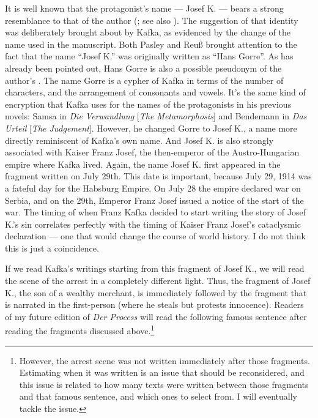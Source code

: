 \documentclass{article}
\begin{document}
It is well known that the protagonist's name –– Josef K. –– bears a
strong resemblance to that of the author (\cite[183]{sokel_franz_1976}; see also \cite[195]{binder_kafka-kommentar_1976}). The suggestion of that identity was
deliberately brought about by Kafka, as evidenced by the change of the
name used in the manuscript. Both Pasley and Reuß brought attention
to the fact that the name ``Josef K.'' was originally written as ``Hans Gorre''. As has
already been pointed out, Hans Gorre is also a possible pseudonym of the
author's \citep[33]{kurze_kafkas_2016}. The name Gorre is a cypher of Kafka in terms
of the number of characters, and the arrangement of consonants and
vowels. It's the same kind of encryption that Kafka uses for the names of the protagonists in
his previous novels: Samsa in \emph{Die
Verwandlung} {[}\emph{The Metamorphosis}{]} and Bendemann in \emph{Das
Urteil} {[}\emph{The Judgement}{]}. However, he changed Gorre to Josef K., a name
more directly reminiscent of Kafka's own name. And Josef K. is
also strongly associated with Kaiser Franz Josef,
the then-emperor of the Austro-Hungarian empire where Kafka lived.
Again, the name Josef K. first appeared in the fragment written on July
29th. This date is important, because July 29, 1914 was a fateful day
for the Habsburg Empire. On July 28 the empire declared war on Serbia,
and on the 29th, Emperor Franz Josef issued a notice of the start of the
war. The timing of when Franz Kafka decided to start writing the story
of Josef K.'s sin correlates perfectly with the timing of Kaiser Franz
Josef's cataclysmic declaration –– one that would change the course of
world history. I do not think this is just a coincidence.

If we read Kafka's writings starting from this fragment of Josef K., we
will read the scene of the arrest in a completely different light. Thus,
the fragment of Josef K., the son of a wealthy merchant, is immediately
followed by the fragment that is narrated in the first-person (where he
steals but protests innocence). Readers of my future edition of
\emph{Der Process} will read the following famous sentence after reading the
fragments discussed above.\footnote{However, the arrest scene was not written
  immediately after those fragments. Estimating when it was written is
  an issue that should be reconsidered, and this issue is related to how
  many texts were written between those fragments and that famous
  sentence, and which ones to select from. I will eventually tackle the
  issue.}
\end{document}
